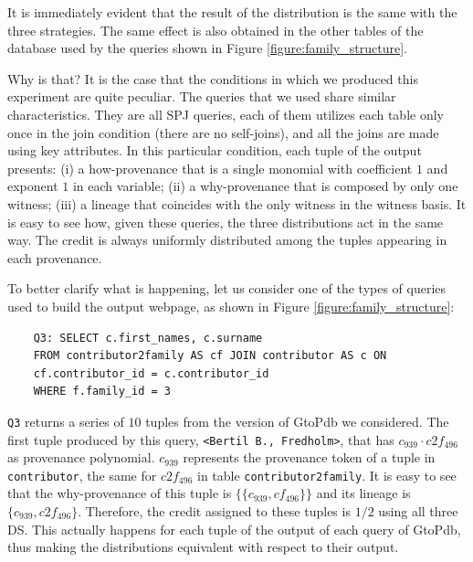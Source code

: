 It is immediately evident that the result of the distribution is the same with the three strategies. The same effect is also obtained in the other tables of the database used by the queries shown in Figure \ref{figure:family_structure}. 

Why is that? 
It is the case that the conditions in which we produced this experiment are quite peculiar. The queries that we used share similar characteristics. They are all SPJ queries, each of them utilizes each table only once in the join condition (there are no self-joins), and all the joins are made using key attributes. 
In this particular condition, each tuple of the output presents: (i) a how-provenance that is a single monomial with coefficient $1$ and exponent $1$ in each variable; (ii) a why-provenance that is composed by only one witness; (iii) a lineage that coincides with the only witness in the witness basis.
It is easy to see how, given these queries, the three distributions act in the same way.
The credit is always uniformly distributed among the tuples appearing in each provenance. 

To better clarify what is happening, let us consider one of the types of queries used to build the output webpage, as shown in Figure \ref{figure:family_structure}:

\vspace{2mm}
{\footnotesize
\begin{adjustwidth}{25pt}{5pt}
	\begin{verbatim}
	Q3: SELECT c.first_names, c.surname
	FROM contributor2family AS cf JOIN contributor AS c ON 
	cf.contributor_id = c.contributor_id 
	WHERE f.family_id = 3
\end{verbatim}
\end{adjustwidth}
}
\vspace{2mm}

\texttt{Q3} returns a series of $10$ tuples from the version of GtoPdb we considered. 
The first tuple produced by this query, \texttt{<Bertil B., Fredholm>}, that has $c_{939} \cdot c2f_{496}$ as provenance polynomial.
$c_{939}$ represents the provenance token of a tuple in \texttt{contributor}, the same for $c2f_{496}$ in table \texttt{contributor2family}. 
It is easy to see that the why-provenance of this tuple is $\{\{c_{939}, cf_{496} \}\}$ and its lineage is $\{c_{939}, c2f_{496} \}$.
Therefore, the credit assigned to these tuples is $1/2$ using all three DS.
This actually happens for each tuple of the output of each query of GtoPdb, thus making the distributions equivalent with respect to their output.

